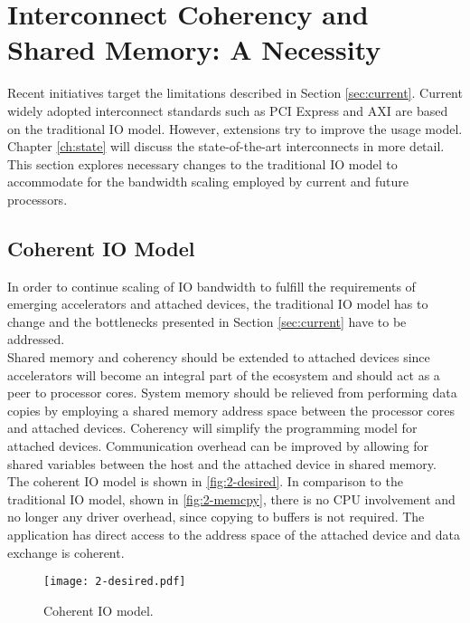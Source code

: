 \section{Interconnect Coherency and Shared Memory: A Necessity}
\label{sec:trends-interconnect}
Recent initiatives target the limitations described in Section \ref{sec:current}. Current widely adopted interconnect standards such as PCI Express and AXI are based on the traditional IO model. However, extensions try to improve the usage model. Chapter \ref{ch:state} will discuss the state-of-the-art interconnects in more detail. This section explores necessary changes to the traditional IO model to accommodate for the bandwidth scaling employed by current and future processors.



\subsection{Coherent IO Model}
In order to continue scaling of IO bandwidth to fulfill the requirements of emerging accelerators and attached devices, the traditional IO model has to change and the bottlenecks presented in Section \ref{sec:current} have to be addressed.\\
Shared memory and coherency should be extended to attached devices since accelerators will become an integral part of the ecosystem and should act as a peer to processor cores. System memory should be relieved from performing data copies by employing a shared memory address space between the processor cores and attached devices. Coherency will simplify the programming model for attached devices. Communication overhead can be improved by allowing for shared variables between the host and the attached device in shared memory.\\
The coherent IO model is shown in \autoref{fig:2-desired}. In comparison to the traditional IO model, shown in \autoref{fig:2-memcpy}, there is no CPU involvement and no longer any driver overhead, since copying to buffers is not required. The application has direct access to the address space of the attached device and data exchange is coherent.

\begin{figure}[h]
  \centering
  \texttt{[image: 2-desired.pdf]}
  \caption{Coherent IO model.}
  \label{fig:2-desired}
\end{figure}

